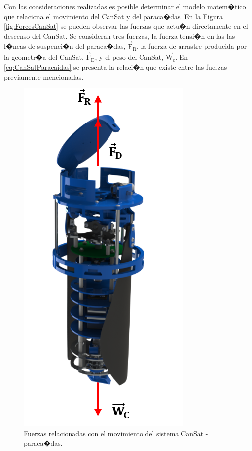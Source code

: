 \documentclass[10pt,a4paper]{book}
\begin{document}
Con las consideraciones realizadas es posible determinar el modelo matem�tico que relaciona el movimiento del CanSat y del paraca�das. En la Figura \ref{fig:ForcesCanSat} se pueden observar las fuerzas que actu�n directamente en el descenso del CanSat. Se consideran tres fuerzas, la fuerza tensi�n en las las l�neas de suspenci�n del paraca�das, $\overrightarrow{\text{F}}_{\text{R}}$, la fuerza de arrastre producida por la geometr�a del CanSat, $\overrightarrow{\text{F}}_{\text{D}}$, y el peso del CanSat, $\overrightarrow{\text{W}}_{\text{c}}$. En \eqref{eq:CanSatParacaidas} se presenta la relaci�n que existe entre las fuerzas previamente mencionadas.\\

\begin{figure}[H]
\begin{center}
\includegraphics[scale=0.40]{Imagenes/Simplificadoparacaidas.png}  
\caption{Fuerzas relacionadas con el  movimiento del sistema CanSat - paraca�das.\label{fig:FuerzasCanSat}}
\end{center}
\end{figure}
\end{document}
